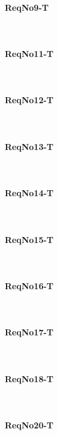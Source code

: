\paragraph{ReqNo9-T}\mbox{}\\ %


\paragraph{ReqNo11-T}\mbox{}\\ %

\paragraph{ReqNo12-T}\mbox{}\\ %


\paragraph{ReqNo13-T}\mbox{}\\ %

\paragraph{ReqNo14-T}\mbox{}\\ %


\paragraph{ReqNo15-T}\mbox{}\\ %


\paragraph{ReqNo16-T}\mbox{}\\ %


\paragraph{ReqNo17-T}\mbox{}\\ %

\paragraph{ReqNo18-T}\mbox{}\\ %


\paragraph{ReqNo20-T}\mbox{}\\ %


